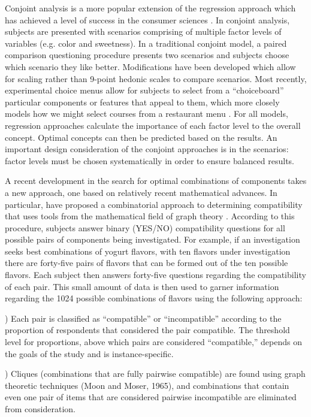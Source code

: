 Conjoint analysis is a more popular extension of the regression approach which has achieved a level of success in the consumer sciences \citep{Green1978,Moskowitz2006}.  In conjoint analysis, subjects are presented with scenarios comprising of multiple factor levels of variables (e.g. color and sweetness).  In a traditional conjoint model, a paired comparison questioning procedure presents two scenarios and subjects choose which scenario they like better.  Modifications have been developed which allow for scaling rather than 9-point hedonic scales \citep{Jones1955} to compare scenarios.  Most recently, experimental choice menus allow for subjects to select from a “choiceboard” particular components or features that appeal to them, which more closely models how we might select courses from a restaurant menu \citep{Liechty2001}.  For all models, regression approaches calculate the importance of each factor level to the overall concept.  Optimal concepts can then be predicted based on the results.  An important design consideration of the conjoint approaches is in the scenarios: factor levels must be chosen systematically in order to ensure balanced results.

A recent development in the search for optimal combinations of components takes a new approach, one based on relatively recent mathematical advances.  In particular, \citet{Ennisa} have proposed a combinatorial approach to determining compatibility \citep[see also][]{Ennis2010,Ennis2011} that uses tools from the mathematical field of graph theory \citep{Cazals2005,Valiente2002}.  According to this procedure, subjects answer binary (YES/NO) compatibility questions for all possible pairs of components being investigated.  For example, if an investigation seeks best combinations of yogurt flavors, with ten flavors under investigation there are forty-five pairs of flavors that can be formed out of the ten possible flavors.  Each subject then answers forty-five questions regarding the compatibility of each pair.   This small amount of data is then used to garner information regarding the 1024 possible combinations of flavors using the following approach:

) Each pair is classified as “compatible” or “incompatible” according to the proportion of respondents that considered the pair compatible.  The threshold level for proportions, above which pairs are considered “compatible,” depends on the goals of the study and is instance-specific.

) Cliques (combinations that are fully pairwise compatible) are found using graph theoretic techniques (Moon and Moser, 1965), and combinations that contain even one pair of items that are considered pairwise incompatible are eliminated from consideration. 

